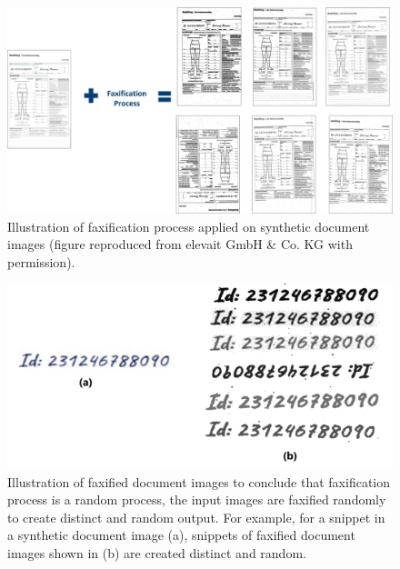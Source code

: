 \begin{figure}[H]
        \begin{center}
	    \includegraphics[scale=0.25]{images/Evaluation/FaxificationProcess.jpg}
	    \caption[Illustration of faxification process applied on synthetic document images.]{Illustration of faxification process applied on synthetic document images (figure reproduced from elevait GmbH \& Co. KG with permission).}
	    \label{fig:FaxificationProcess}
	    \end{center}
\end{figure}



\begin{figure}[H]
        \begin{center}
	    \includegraphics[scale=0.15]{images/Evaluation/FaxificationProcessZoomed.jpg}
	    \caption[Illustration of faxified document images to conclude that faxification process is a random process, the input images are faxified randomly to create distinct output.]{Illustration of faxified document images to conclude that faxification process is a random process, the input images are faxified randomly to create distinct and random output. For example, for a snippet in a synthetic document image (a), snippets of faxified document images shown in (b) are created distinct and random.}
	    \label{fig:FaxificationProcessZoomed}
	    \end{center}
\end{figure}






